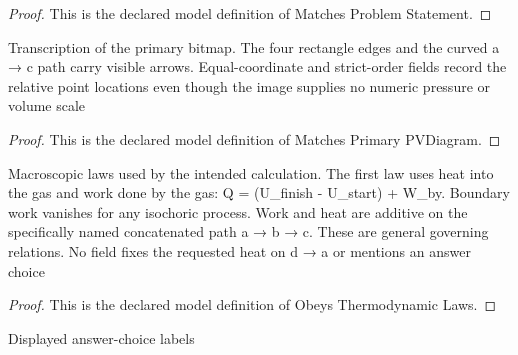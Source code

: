 \begin{proof}
  This is the declared model definition of Matches Problem Statement.
\end{proof}
\begin{definition}
  \label{def:physics:phyx-mini-0494:phyxminiproblems-problemphyxmini0494-matchesprimarypvdiagram}
  Transcription of the primary bitmap. The four rectangle edges and the curved a → c path carry visible arrows. Equal-coordinate and strict-order fields record the relative point locations even though the image supplies no numeric pressure or volume scale
\end{definition}
\begin{proof}
  This is the declared model definition of Matches Primary PVDiagram.
\end{proof}
\begin{definition}
  \label{def:physics:phyx-mini-0494:phyxminiproblems-problemphyxmini0494-obeysthermodynamiclaws}
  Macroscopic laws used by the intended calculation. The first law uses heat into the gas and work done by the gas: Q = (U\_finish - U\_start) + W\_by. Boundary work vanishes for any isochoric process. Work and heat are additive on the specifically named concatenated path a → b → c. These are general governing relations. No field fixes the requested heat on d → a or mentions an answer choice
\end{definition}
\begin{proof}
  This is the declared model definition of Obeys Thermodynamic Laws.
\end{proof}
\begin{definition}
  \label{def:physics:phyx-mini-0494:phyxminiproblems-problemphyxmini0494-answerchoice}
  Displayed answer-choice labels
\end{definition}
